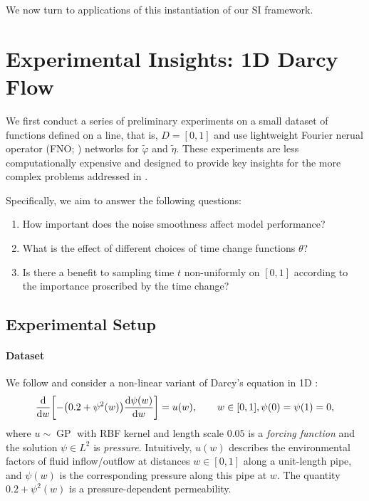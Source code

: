 We now turn to applications of this instantiation of our SI framework.

\section{Experimental Insights: 1D Darcy Flow} \label{sec:prelim}
We first conduct a series of preliminary experiments on a small dataset of functions defined on a line, that is, \(D = [0, 1]\) and use lightweight Fourier nerual operator (FNO; \citealp{li2020fourier}) networks for \(\widetilde{\varphi}\) and \(\widetilde{\eta}\). These experiments are less computationally expensive and designed to provide key insights for the more complex problems addressed in .

Specifically, we aim to answer the following questions:
\begin{enumerate}
  \item How important does the noise smoothness affect model performance?
  \item What is the effect of different choices of time change functions \(\theta\)?
  \item Is there a benefit to sampling time \(t\) non-uniformly on \([0, 1]\) according to the importance proscribed by the time change?
\end{enumerate}
\subsection{Experimental Setup}
\paragraph{Dataset}
We follow \citep{bahmani2025resolution} and consider a non-linear variant of Darcy's equation in 1D \citep{whitaker1986flow}:
\begin{equation}
  \dv{w}\qty[-\qty(0.2 + \psi^{2}(w)) \dv{\psi(w)}{w}] = u(w), \qquad w \in [0, 1], \psi(0) = \psi(1) = 0,\label{eqn:d1d}
\end{equation}
where \(u \sim \operatorname{GP}\) with RBF kernel and length scale \(0.05\) is a \textit{forcing function} and the solution \(\psi \in L^{2}\) is \textit{pressure}. Intuitively,  \(u(w)\) describes the environmental factors of fluid inflow/outflow at distances \(w \in [0, 1]\) along a unit-length pipe, and \(\psi(w)\) is the corresponding pressure along this pipe at \(w\). The quantity \(0.2 + \psi^{2}(w)\) is a pressure-dependent permeability.

